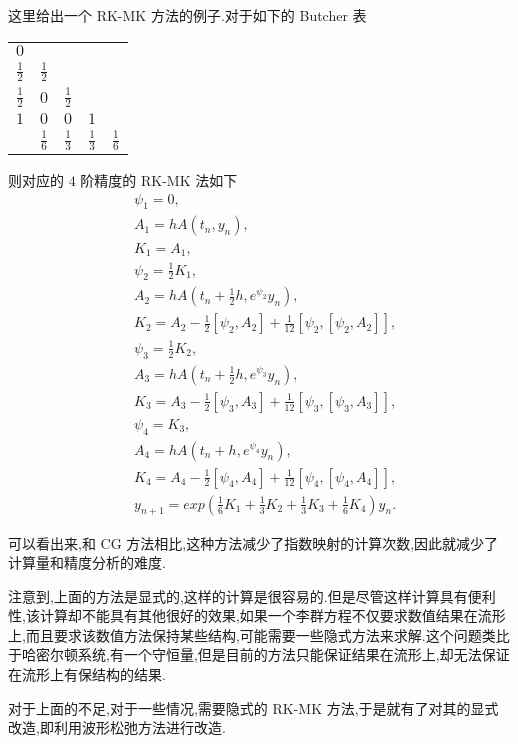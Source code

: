 这里给出一个 RK-MK 方法的例子.对于如下的 Butcher 表
\begin{center}
  \begin{tabular}{c|cccc}
    $0$&&&&\\
    $\frac{1}{2}$&$\frac{1}{2}$&&&\\
    $\frac{1}{2}$&$0$&$\frac{1}{2}$&&\\
    $1$&$0$&$0$&$1$&\\
    \hline
         &$\frac{1}{6}$&$\frac{1}{3}$&$\frac{1}{3}$&$\frac{1}{6}$
  \end{tabular}
\end{center}

则对应的 $4$ 阶精度的 RK-MK 法如下
\begin{equation*}
	\begin{aligned}
		&\psi_1=0,\\
		&A_1=hA(t_n,y_n),\\
		&K_1=A_1,\\
		&\psi_2=\frac{1}{2}K_1,\\
		&A_2=hA(t_n+\frac{1}{2}h,e^{\psi_2}y_n),\\
		&K_2=A_2-\frac{1}{2}[\psi_2,A_2]+\frac{1}{12}[\psi_2,[\psi_2,A_2]],\\
		&\psi_3=\frac{1}{2}K_2,\\
		&A_3=hA(t_n+\frac{1}{2}h,e^{\psi_3}y_n),\\
		&K_3=A_3-\frac{1}{2}[\psi_3,A_3]+\frac{1}{12}[\psi_3,[\psi_3,A_3]],\\
		&\psi_4=K_3,\\
		&A_4=hA(t_n+h,e^{\psi_4}y_n),\\
		&K_4=A_4-\frac{1}{2}[\psi_4,A_4]+\frac{1}{12}[\psi_4,[\psi_4,A_4]],\\
		&y_{n+1}=exp(\frac{1}{6}K_1+\frac{1}{3}K_2+\frac{1}{3}K_3+\frac{1}{6}K_4)y_n.
	\end{aligned}
\end{equation*}

可以看出来,和 CG 方法相比,这种方法减少了指数映射的计算次数,因此就减少了计算量和精度分析的难度.

注意到,上面的方法是显式的,这样的计算是很容易的.但是尽管这样计算具有便利性,该计算却不能具有其他很好的效果,如果一个李群方程不仅要求数值结果在流形上,而且要求该数值方法保持某些结构,可能需要一些隐式方法来求解.这个问题类比于哈密尔顿系统,有一个守恒量,但是目前的方法只能保证结果在流形上,却无法保证在流形上有保结构的结果.

对于上面的不足,对于一些情况,需要隐式的 RK-MK 方法,于是就有了对其的显式改造,即利用波形松弛方法进行改造.

